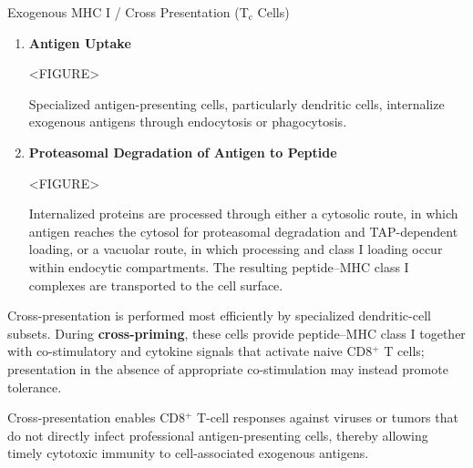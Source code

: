     \begin{core}[label=core:cross_presentation]{Exogenous MHC I / Cross Presentation (T$_{\text{c}}$ Cells)}

      \begin{enumerate}[label=(\arabic*)]

        \item \textbf{Antigen Uptake}

          <FIGURE>

          Specialized antigen-presenting cells, particularly dendritic cells, internalize exogenous antigens through endocytosis or phagocytosis.

        \item \textbf{Proteasomal Degradation of Antigen to Peptide}

          <FIGURE>

          Internalized proteins are processed through either a cytosolic route, in which antigen reaches the cytosol for proteasomal degradation and TAP-dependent loading, or a vacuolar route, in which processing and class I loading occur within endocytic compartments. The resulting peptide--MHC class I complexes are transported to the cell surface.

      \end{enumerate}

      Cross-presentation is performed most efficiently by specialized dendritic-cell subsets. During \textbf{cross-priming}, these cells provide peptide--MHC class I together with co-stimulatory and cytokine signals that activate naive CD8$^+$ T cells; presentation in the absence of appropriate co-stimulation may instead promote tolerance.

      Cross-presentation enables CD8$^+$ T-cell responses against viruses or tumors that do not directly infect professional antigen-presenting cells, thereby allowing timely cytotoxic immunity to cell-associated exogenous antigens.

    \end{core}

